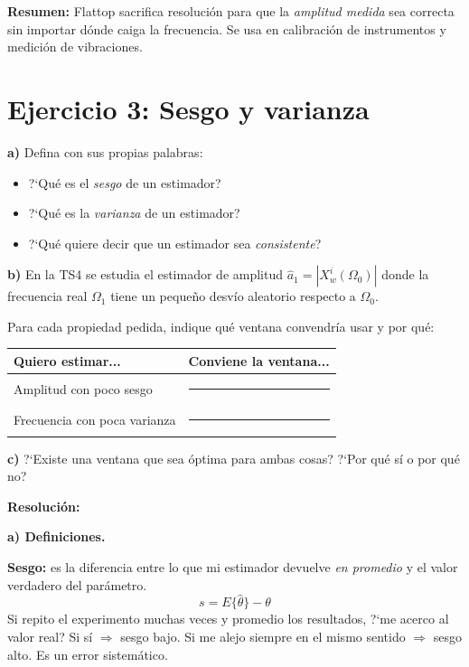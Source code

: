 \documentclass[11pt, a4paper]{article}
\newcommand{\res}{\smallskip\noindent\textbf{\color{enunline}Resoluci\'on:}\smallskip}
\begin{document}
\textbf{Resumen:} Flattop sacrifica resoluci\'on para que la
\emph{amplitud medida} sea correcta sin importar d\'onde caiga la frecuencia.
Se usa en calibraci\'on de instrumentos y medici\'on de vibraciones.

\section*{Ejercicio 3: Sesgo y varianza}

\begin{enun}
\textbf{a)} Defina con sus propias palabras:
\begin{itemize}[noitemsep]
  \item ?`Qu\'e es el \emph{sesgo} de un estimador?
  \item ?`Qu\'e es la \emph{varianza} de un estimador?
  \item ?`Qu\'e quiere decir que un estimador sea \emph{consistente}?
\end{itemize}

\textbf{b)} En la TS4 se estudia el estimador de amplitud
$\hat{a}_1 = |X_w^i(\Omega_0)|$ donde la frecuencia real $\Omega_1$ tiene
un peque\~no desv\'io aleatorio respecto a $\Omega_0$.

Para cada propiedad pedida, indique qu\'e ventana convendr\'ia usar
y por qu\'e:

\begin{center}
\begin{tabular}{lc}
\toprule
Quiero estimar... & Conviene la ventana... \\
\midrule
Amplitud con poco sesgo            & \rule{4cm}{0.3pt} \\
Frecuencia con poca varianza       & \rule{4cm}{0.3pt} \\
\bottomrule
\end{tabular}
\end{center}

\textbf{c)} ?`Existe una ventana que sea \'optima para ambas cosas?
?`Por qu\'e s\'i o por qu\'e no?
\end{enun}

\res

\textbf{a) Definiciones.}

\textbf{Sesgo:} es la diferencia entre lo que mi estimador devuelve
\emph{en promedio} y el valor verdadero del par\'ametro.
\[
  s = E\{\hat{\theta}\} - \theta
\]
Si repito el experimento muchas veces y promedio los resultados,
?`me acerco al valor real?
Si s\'i $\Rightarrow$ sesgo bajo.
Si me alejo siempre en el mismo sentido $\Rightarrow$ sesgo alto.
Es un error sistem\'atico.
\end{document}
